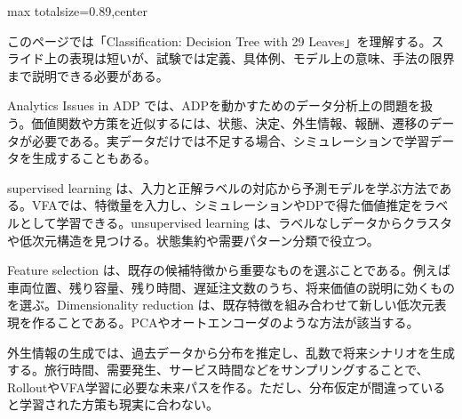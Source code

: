 \begin{minipage}[t]{0.58\textwidth}
\begin{adjustbox}{max totalsize={\textwidth}{0.89\textheight},center}
\begin{minipage}{\textwidth}\scriptsize
{}このページでは「Classification: Decision Tree with 29 Leaves」を理解する。スライド上の表現は短いが、試験では定義、具体例、モデル上の意味、手法の限界まで説明できる必要がある。\par
Analytics Issues in ADP では、ADPを動かすためのデータ分析上の問題を扱う。価値関数や方策を近似するには、状態、決定、外生情報、報酬、遷移のデータが必要である。実データだけでは不足する場合、シミュレーションで学習データを生成することもある。\par
supervised learning は、入力と正解ラベルの対応から予測モデルを学ぶ方法である。VFAでは、特徴量を入力し、シミュレーションやDPで得た価値推定をラベルとして学習できる。unsupervised learning は、ラベルなしデータからクラスタや低次元構造を見つける。状態集約や需要パターン分類で役立つ。\par
Feature selection は、既存の候補特徴から重要なものを選ぶことである。例えば車両位置、残り容量、残り時間、遅延注文数のうち、将来価値の説明に効くものを選ぶ。Dimensionality reduction は、既存特徴を組み合わせて新しい低次元表現を作ることである。PCAやオートエンコーダのような方法が該当する。\par
外生情報の生成では、過去データから分布を推定し、乱数で将来シナリオを生成する。旅行時間、需要発生、サービス時間などをサンプリングすることで、RolloutやVFA学習に必要な未来パスを作る。ただし、分布仮定が間違っていると学習された方策も現実に合わない。\par

\end{minipage}
\end{adjustbox}
\end{minipage}
